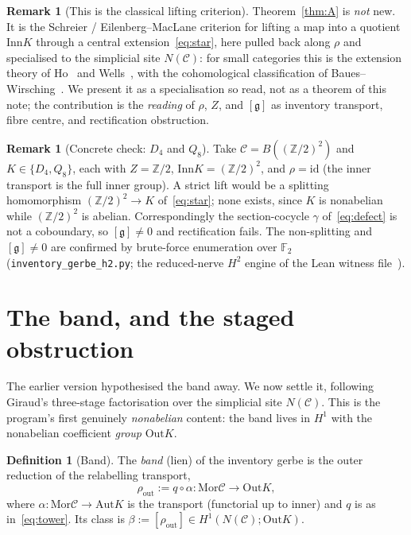 \documentclass[11pt]{article}
\theoremstyle{definition}
\newtheorem{definition}[theorem]{Definition}
\newtheorem{remark}[theorem]{Remark}
\newcommand{\C}{\mathcal{C}}
\newcommand{\Mor}{\mathrm{Mor}}
\newcommand{\id}{\mathrm{id}}
\newcommand{\Z}{\mathbb{Z}}
\newcommand{\Aut}{\mathrm{Aut}}
\newcommand{\Inn}{\mathrm{Inn}}
\newcommand{\Out}{\mathrm{Out}}
\newcommand{\Zc}{Z}
\newcommand{\gerbe}{\mathfrak{g}}
\begin{document}
\begin{remark}[This is the classical lifting criterion]\label{rem:classical}
Theorem~\ref{thm:A} is \emph{not} new. It is the Schreier / Eilenberg--MacLane criterion for
lifting a map into a quotient $\Inn K$ through a central extension~\eqref{eq:star}, here pulled back
along $\rho$ and specialised to the simplicial site $N(\C)$: for small categories this is the
extension theory of Ho~\cite{ho} and Wells~\cite{wells}, with the cohomological classification of
Baues--Wirsching~\cite{bw}. We present it as a specialisation so read, not as a theorem of this
note; the contribution is the \emph{reading} of $\rho$, $\Zc$, and $[\gerbe]$ as inventory transport,
fibre centre, and rectification obstruction.
\end{remark}

\begin{remark}[Concrete check: $D_4$ and $Q_8$]\label{rem:d4q8}
Take $\C=B((\Z/2)^2)$ and $K\in\{D_4,Q_8\}$, each with $\Zc=\Z/2$, $\Inn K=(\Z/2)^2$, and
$\rho=\id$ (the inner transport is the full inner group). A strict lift would be a splitting
homomorphism $(\Z/2)^2\to K$ of~\eqref{eq:star}; none exists, since $K$ is nonabelian while
$(\Z/2)^2$ is abelian. Correspondingly the section-cocycle $\gamma$ of~\eqref{eq:defect} is not a
coboundary, so $[\gerbe]\neq0$ and rectification fails. The non-splitting and $[\gerbe]\neq0$ are
confirmed by brute-force enumeration over $\mathbb F_2$ (\texttt{inventory\_gerbe\_h2.py}; the
reduced-nerve $H^2$ engine of the Lean witness file~\cite{leanwit}).
\end{remark}

\section{The band, and the staged obstruction}\label{sec:band}

The earlier version hypothesised the band away. We now settle it, following Giraud's three-stage
factorisation over the simplicial site $N(\C)$. This is the program's first genuinely
\emph{nonabelian} content: the band lives in $H^1$ with the nonabelian coefficient \emph{group}
$\Out K$.

\begin{definition}[Band]
The \emph{band} (lien) of the inventory gerbe is the outer reduction of the relabelling transport,
\[
\rho_{\mathrm{out}}:=q\circ\alpha:\Mor\C\longrightarrow\Out K,
\]
where $\alpha:\Mor\C\to\Aut K$ is the transport (functorial up to inner) and $q$ is as
in~\eqref{eq:tower}. Its class is $\beta:=[\rho_{\mathrm{out}}]\in H^1(N(\C);\Out K)$.
\end{definition}
\end{document}

